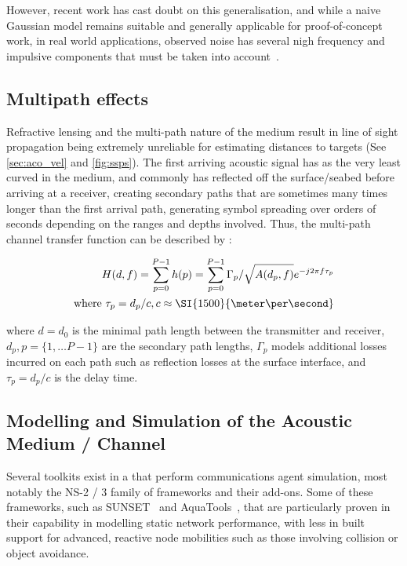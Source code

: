 However, recent work has cast doubt on this generalisation, and while a naive Gaussian model remains suitable and generally applicable for proof-of-concept work,  in real world applications, observed noise has several nigh frequency and impulsive components that must be taken into account~\cite{Mahmood2016, Deane2016}. 

\subsection{Multipath effects}

Refractive lensing and the multi-path nature of the medium result in line of sight propagation being extremely unreliable for estimating distances to targets (See \autoref{sec:aco_vel} and \autoref{fig:ssps}).
The first arriving acoustic signal has as the very least curved in the medium, and commonly has reflected off the surface/seabed before arriving at a receiver, creating secondary paths that are sometimes many times longer than the first arrival path, generating symbol spreading over orders of seconds depending on the ranges and depths involved.
Thus, the multi-path channel transfer function can be described by :

\begin{align}
  \label{eq:acomultipath}
  H(d,f) =\sum_{p=0}^{P-1} h(p) = \sum_{p=0}^{P-1} \Gamma_p / \sqrt{A(d_p,f)}e^{-j 2 \pi f \tau_p} \\
  \text{where } \tau_p = d_p/c, c \approx \SI{1500}{\meter\per\second} \notag
\end{align}

where $d=d_0$ is the minimal path length between the transmitter and receiver, $d_p,p=\{1,\dots P-1\}$ are the secondary path lengths, $\Gamma_p$ models additional losses incurred on each path such as reflection losses at the surface interface, and $\tau_p = d_p/c$ is the delay time.


\subsection{Modelling and Simulation of the Acoustic Medium / Channel}

Several toolkits exist in a that perform communications agent simulation, most notably the NS-2 / 3 family of frameworks and their add-ons.
Some of these frameworks, such as SUNSET~\cite{Petrioli2012a} and AquaTools~\cite{Sehgal2010}, that are particularly proven in their capability in modelling static network performance, with less in built support for advanced, reactive node mobilities such as those involving collision or object avoidance.

